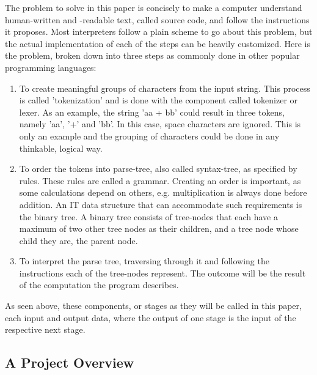 \documentclass[12pt,a4paper]{report}
\newcommand{\pagelabel}[1]{\phantomsection\label{#1}}
\begin{document}
The problem to solve in this paper is concisely to make a computer understand
human-written and -readable text, called source code, and follow the instructions
it proposes.
Most interpreters follow a plain scheme to go about this problem, but the
actual implementation of each of the steps can be heavily customized.
Here is the problem, broken down into three steps as commonly done in other
popular programming languages:
\begin{enumerate}\pagelabel{simple interpreter}
    \item To create meaningful groups of characters from the input string. This
        process is called 'tokenization' and is done with the component called
        tokenizer or lexer. As an example, the string 'aa + bb' could result
        in three tokens, namely 'aa', '+' and 'bb'. In this case, space characters
        are ignored. 
        This is only an example and the grouping of characters could be done 
        in any thinkable, logical way.
    \item To order the tokens into parse-tree, also called syntax-tree, as
        specified by rules. These rules are called a grammar.
        Creating an order is important, as some calculations depend on others, e.g. multiplication
        is always done before addition. An IT data structure that can accommodate
        such requirements is the binary tree. A binary tree consists of tree-nodes
        that each have a maximum of two other tree nodes as their children, and
        a tree node whose child they are, the parent node.
    \item To interpret the parse tree, traversing through it and following the
        instructions each of the tree-nodes represent. The outcome
        will be the result of the computation the program describes.
\end{enumerate}

As seen above, these components, or stages as they will be called in this paper,
each input and output data, where the output of one stage is the input of the
respective next stage.

\subsection{A Project Overview}
\end{document}
